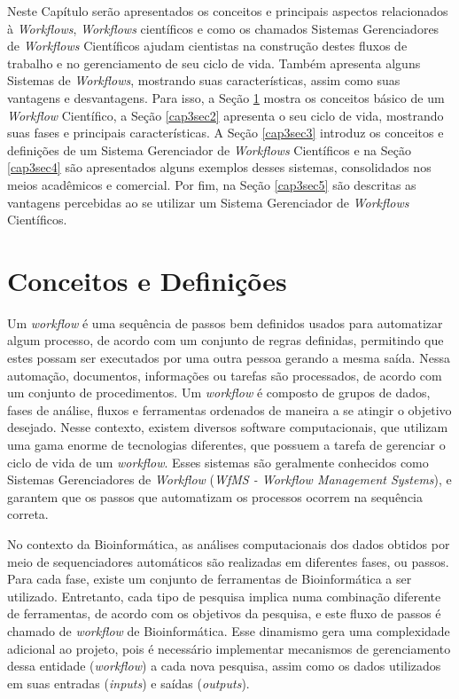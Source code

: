 Neste Capítulo serão apresentados os conceitos e principais aspectos relacionados à \textit{Workflows}, \textit{Workflows} científicos e como os chamados Sistemas Gerenciadores de \textit{Workflows} Científicos ajudam cientistas na construção destes fluxos de trabalho e no gerenciamento de seu ciclo de vida. Também apresenta alguns Sistemas de \textit{Workflows}, mostrando suas características, assim como suas vantagens e desvantagens. Para isso, a Seção \ref{cap3sec1} mostra os conceitos básico de um \textit{Workflow} Científico, a Seção \ref{cap3sec2} apresenta o seu ciclo de vida, mostrando suas fases e principais características. A Seção \ref{cap3sec3} introduz os conceitos e definições de um Sistema Gerenciador de \textit{Workflows} Científicos e na Seção \ref{cap3sec4} são apresentados alguns exemplos desses sistemas, consolidados nos meios acadêmicos e comercial. Por fim, na Seção \ref{cap3sec5} são descritas as vantagens percebidas ao se utilizar um Sistema Gerenciador de \textit{Workflows} Científicos.

\section{Conceitos e Definições} \label{cap3sec1}

Um \textit{workflow} é uma sequência de passos bem definidos usados para automatizar algum processo, de acordo com um conjunto de regras definidas, permitindo que estes possam ser executados por uma outra pessoa gerando a mesma saída. Nessa automação, documentos, informações ou tarefas são processados, de acordo com um conjunto de procedimentos. Um \textit{workflow} é composto de grupos de dados, fases de análise, fluxos e ferramentas ordenados de maneira a se atingir o objetivo desejado. Nesse contexto, existem diversos software computacionais, que utilizam uma gama enorme de tecnologias diferentes, que possuem a tarefa de gerenciar o ciclo de vida de um \textit{workflow}. Esses sistemas são geralmente conhecidos como Sistemas Gerenciadores de \textit{Workflow} (\textit{WfMS - Workflow Management Systems}), e garantem que os passos que automatizam os processos ocorrem na sequência correta.

No contexto da Bioinformática, as análises computacionais dos dados obtidos por meio de sequenciadores automáticos são realizadas em diferentes fases, ou passos. Para cada fase, existe um conjunto de ferramentas de Bioinformática a ser utilizado. Entretanto, cada tipo de pesquisa implica numa combinação diferente de ferramentas, de acordo com os objetivos da pesquisa, e este fluxo de passos é chamado de \textit{workflow} de Bioinformática. Esse dinamismo gera uma complexidade adicional ao projeto, pois é necessário implementar mecanismos de gerenciamento dessa entidade (\textit{workflow}) a cada nova pesquisa, assim como os dados utilizados em suas entradas (\textit{inputs}) e saídas (\textit{outputs}).

